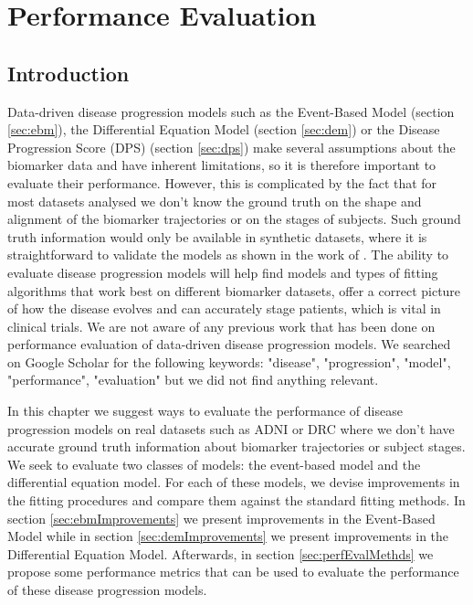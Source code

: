 \chapter{Performance Evaluation}
\label{chapter:perf}

\section{Introduction}

Data-driven disease progression models such as the Event-Based Model (section \ref{sec:ebm}), the Differential Equation Model (section \ref{sec:dem}) or the Disease Progression Score (DPS) (section \ref{sec:dps}) make several assumptions about the biomarker data and have inherent limitations, so it is therefore important to evaluate their performance. However, this is complicated by the fact that for most datasets analysed we don't know the ground truth on the shape and alignment of the biomarker trajectories or on the stages of subjects. Such ground truth information would only be available in synthetic datasets, where it is straightforward to validate the models as shown in the work of \cite{young2015simulation}. The ability to evaluate disease progression models will help find models and types of fitting algorithms that work best on different biomarker datasets, offer a correct picture of how the disease evolves and can accurately stage patients, which is vital in clinical trials. We are not aware of any previous work that has been done on performance evaluation of data-driven disease progression models. We searched on Google Scholar for the following keywords: "disease", "progression", "model", "performance", "evaluation" but we did not find anything relevant. 

In this chapter we suggest ways to evaluate the performance of disease progression models on real datasets such as ADNI or DRC where we don't have accurate ground truth information about biomarker trajectories or subject stages. We seek to evaluate two classes of models: the event-based model and the differential equation model. For each of these models, we devise improvements in the fitting procedures and compare them against the standard fitting methods. In section \ref{sec:ebmImprovements} we present improvements in the Event-Based Model while in section \ref{sec:demImprovements} we present improvements in the Differential Equation Model. Afterwards, in section \ref{sec:perfEvalMethds} we propose some performance metrics that can be used to evaluate the performance of these disease progression models. 

